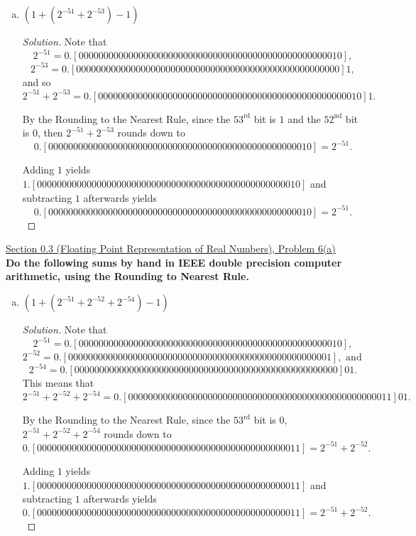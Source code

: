 \documentclass[11pt]{article}
\newenvironment{solution}
  {\renewcommand\qedsymbol{$\blacksquare$}\begin{proof}[Solution]}
  {\end{proof}}
\theoremstyle{definition}
\begin{document}
\begin{enumerate}[a)] 
    \item $(1 + (2^{-51} + 2^{-53}) - 1)$

    \begin{solution}
    Note that \[2^{-51} = 0.[00000000000000000000000000000000000000000000000000010],\] \[2^{-53} = 0.[00000000000000000000000000000000000000000000000000000]1,\] 
    and so \[ 2^{-51} + 2^{-53} = 0.[00000000000000000000000000000000000000000000000000010]1.\]

    By the Rounding to the Nearest Rule, since the $53^{\text{rd}}$ bit is $1$ and the $52^{\text{nd}}$ bit is $0$, then $2^{-51} + 2^{-53}$ rounds down to
    \[0.[00000000000000000000000000000000000000000000000000010] = 2^{-51}.\]

    Adding $1$ yields $1.[00000000000000000000000000000000000000000000000000010]$ and subtracting $1$ afterwards yields
    \[ \boxed{0.[00000000000000000000000000000000000000000000000000010] = 2^{-51}}.\]
    \end{solution}
\end{enumerate}



\underline{Section 0.3 (Floating Point Representation of Real Numbers), Problem 6(a)} \\

\textbf{Do the following sums by hand in IEEE double precision computer arithmetic, using the Rounding to Nearest Rule.}

\begin{enumerate}[a)] 
    \item $(1 + (2^{-51} + 2^{-52} + 2^{-54}) - 1)$
    \begin{solution}
        Note that \[2^{-51} = 0.[00000000000000000000000000000000000000000000000000010],\] \[2^{-52} = 0.[00000000000000000000000000000000000000000000000000001], \text{ and }\] 
        \[ 2^{-54} = 0.[00000000000000000000000000000000000000000000000000000]01.\]
        This means that \[ 2^{-51} + 2^{-52} + 2^{-54}= 0.[00000000000000000000000000000000000000000000000000011]01.\]
    
        By the Rounding to the Nearest Rule, since the $53^{\text{rd}}$ bit is $0$, $2^{-51} + 2^{-52} + 2^{-54}$ rounds down to
        \[0.[00000000000000000000000000000000000000000000000000011] = 2^{-51} + 2^{-52}.\]
    
        Adding $1$ yields $1.[00000000000000000000000000000000000000000000000000011]$ and subtracting $1$ afterwards yields
        \[ \boxed{0.[00000000000000000000000000000000000000000000000000011] = 2^{-51} + 2^{-52}}.\]
        \end{solution}

\end{enumerate}
\end{document}
